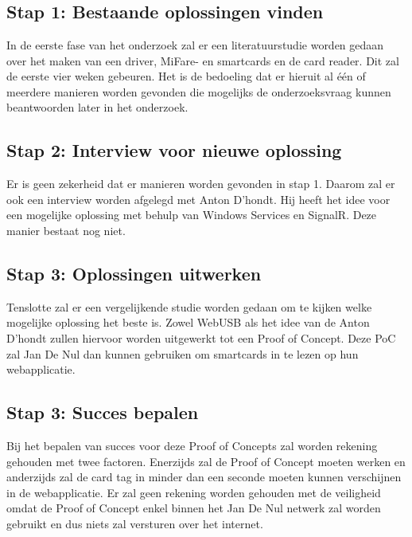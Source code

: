 \graphicspath{{graphics/}}
\chapter{}%
\label{ch:methodologie}

\section{Stap 1: Bestaande oplossingen vinden}
In de eerste fase van het onderzoek zal er een literatuurstudie worden gedaan over het maken van een driver, MiFare- en smartcards en de card reader. Dit zal de eerste vier weken gebeuren. Het is de bedoeling dat er hieruit al één of meerdere manieren worden gevonden die mogelijks de onderzoeksvraag kunnen beantwoorden later in het onderzoek.

\section{Stap 2: Interview voor nieuwe oplossing}
Er is geen zekerheid dat er manieren worden gevonden in stap 1. Daarom zal er ook een interview worden afgelegd met Anton D'hondt. Hij heeft het idee voor een mogelijke oplossing met behulp van Windows Services en SignalR. Deze manier bestaat nog niet.

\section{Stap 3: Oplossingen uitwerken}
Tenslotte zal er een vergelijkende studie worden gedaan om te kijken welke mogelijke oplossing het beste is. Zowel WebUSB als het idee van de Anton D'hondt zullen hiervoor worden uitgewerkt tot een Proof of Concept. Deze PoC zal Jan De Nul dan kunnen gebruiken om smartcards in te lezen op hun webapplicatie. 

\section{Stap 3: Succes bepalen}
Bij het bepalen van succes voor deze Proof of Concepts zal worden rekening gehouden met twee factoren. Enerzijds zal de Proof of Concept moeten werken en anderzijds zal de card tag in minder dan een seconde moeten kunnen verschijnen in de webapplicatie. Er zal geen rekening worden gehouden met de veiligheid omdat de Proof of Concept enkel binnen het Jan De Nul netwerk zal worden gebruikt en dus niets zal versturen over het internet.


